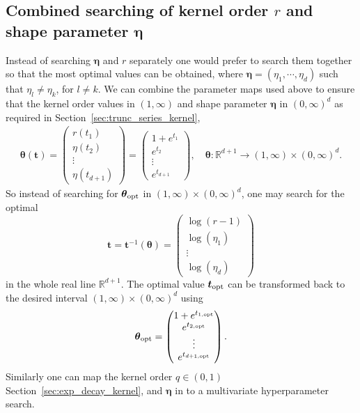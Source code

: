\documentclass{svjour3}                     %
\newcommand{\bm}[1]{\boldsymbol{#1}}
\newcommand{\reals}{\mathbb{R}}
\newcommand{\veta}{{\bm{\eta}}}
\newcommand{\vtheta}{{\bm{\theta}}}
\newcommand{\vt}{\bm{t}}
\newcommand\secref{Section~\ref}
\begin{document}
\subsection{Combined searching of kernel order $r$ and shape parameter $\veta$}
Instead of searching $\veta$ and $r$ separately one would prefer to search them together so that the most optimal values can be obtained, where $\veta = (\eta_1, \cdots, \eta_d)$ such that $\eta_l \ne \eta_k$,  for $l \ne k$.
We can combine the parameter maps used above to ensure that the kernel order values in $(1, \infty)$ and shape parameter $\veta$ in $(0,\infty)^d$ as required in \secref{sec:trunc_series_kernel},
\begin{align*}
\vtheta(\vt) = 
\begin{pmatrix}
r(t_{1}) \\ \eta(t_2) \\ \vdots \\ \eta(t_{d+1}) 
\end{pmatrix} =
\begin{pmatrix}
1 + e^{t_1} \\ e^{t_2} \\ \vdots \\ e^{t_{d+1}}
\end{pmatrix}, 
\quad
\vtheta: \reals^{d+1} \to (1,\infty) \times (0,\infty)^d .
\end{align*}
So instead of searching for $\vtheta_{\textup{opt}}$ in $(1,\infty) \times (0,\infty)^d$, one may search for the optimal 
$$
\vt = \vt^{-1} (\vtheta) = 
\begin{pmatrix}
\log(r-1) \\ \log(\eta_1) \\ \vdots \\ \log(\eta_d)
\end{pmatrix}
$$ in the whole real line $\reals^{d+1}$.
The optimal value $\vt_{\textup{opt}}$ can be transformed back to the desired interval $(1,\infty) \times (0,\infty)^d$ using 
\begin{align*}
\vtheta_{\textup{opt}} = 
\begin{pmatrix}
1 + e^{t_{1, \textup{opt}}} \\
e^{t_{2, \textup{opt}}} \\
\vdots \\
e^{t_{d+1, \textup{opt}}} \\
\end{pmatrix}.
\end{align*}
Similarly one can map the kernel order $q \in (0,1)$ \secref{sec:exp_decay_kernel}, and $\veta$ in to a multivariate hyperparameter search.
\end{document}

